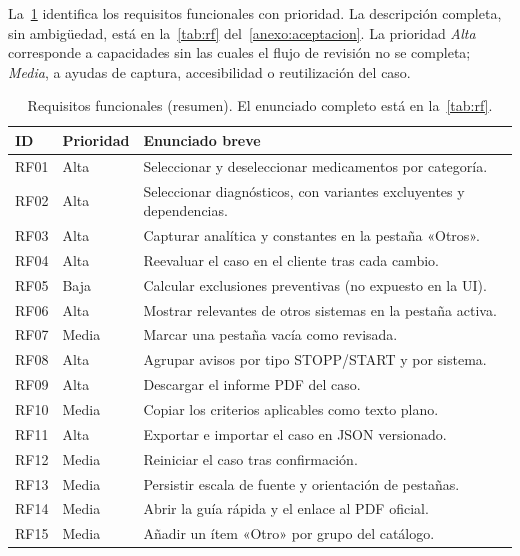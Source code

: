 La~\cref{tab:rf-resumen} identifica los requisitos funcionales con
prioridad. La descripción completa, sin ambigüedad, está en
la~\cref{tab:rf} del~\cref{anexo:aceptacion}. La prioridad \emph{Alta}
corresponde a capacidades sin las cuales el flujo de revisión no se
completa; \emph{Media}, a ayudas de captura, accesibilidad o reutilización
del caso.

\begin{table}[H]
  \centering
  \scriptsize
  \begin{tabularx}{\textwidth}{@{}llX@{}}
    \toprule
    \textbf{ID} & \textbf{Prioridad} & \textbf{Enunciado breve} \\
    \midrule
    RF01 & Alta & Seleccionar y deseleccionar medicamentos por categoría. \\
    RF02 & Alta & Seleccionar diagnósticos, con variantes excluyentes y dependencias. \\
    RF03 & Alta & Capturar analítica y constantes en la pestaña «Otros». \\
    RF04 & Alta & Reevaluar el caso en el cliente tras cada cambio. \\
    RF05 & Baja & Calcular exclusiones preventivas (no expuesto en la UI). \\
    RF06 & Alta & Mostrar relevantes de otros sistemas en la pestaña activa. \\
    RF07 & Media & Marcar una pestaña vacía como revisada. \\
    RF08 & Alta & Agrupar avisos por tipo STOPP/START y por sistema. \\
    RF09 & Alta & Descargar el informe PDF del caso. \\
    RF10 & Media & Copiar los criterios aplicables como texto plano. \\
    RF11 & Alta & Exportar e importar el caso en JSON versionado. \\
    RF12 & Media & Reiniciar el caso tras confirmación. \\
    RF13 & Media & Persistir escala de fuente y orientación de pestañas. \\
    RF14 & Media & Abrir la guía rápida y el enlace al PDF oficial. \\
    RF15 & Media & Añadir un ítem «Otro» por grupo del catálogo. \\
    \bottomrule
  \end{tabularx}
  \caption{Requisitos funcionales (resumen). El enunciado completo está
    en la~\cref{tab:rf}.}
  \label{tab:rf-resumen}
\end{table}


